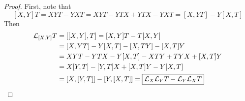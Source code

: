 \documentclass[a4paper, 10pt]{article}
\begin{document}
\begin{proof}
    First, note that
    \[ [X, Y]T = XYT - YXT = XYT - YTX + YTX - YXT = [X, YT] - Y[X, T] \]
    Then
    \begin{align*}
        \mathcal{L}_{[X,Y]}T &= [[X,Y],T] = [X,Y]T - T[X,Y] \\
        &= [X, YT] - Y[X,T] - [X, TY] - [X,T]Y \\
        &= XYT - YTX - Y[X,T] - XTY + TYX + [X,T]Y \\
        &= X[Y, T] - [Y, T]X + [X, T]Y - Y[X, T] \\
        &= [X, [Y, T]] - [Y, [X, T]] = \boxed{\mathcal{L}_{X}\mathcal{L}_{Y}T - \mathcal{L}_{Y}\mathcal{L}_{X}T}
    \end{align*}
\end{proof}
\end{document}
